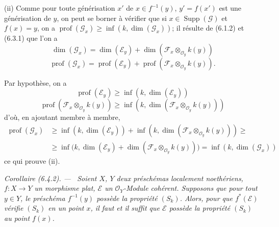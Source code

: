 \documentclass[10pt,oneside]{book}
\newcommand{\oldpage}[2][]{%
  \setcounter{footnote}{0}%
  \marginpar{\scriptsize\textbf{#1}~|~#2}\ignorespaces}
\newenvironment{corollary}[1][]{%
  \par\medskip\noindent\itshape Corollaire (#1). ---\ }{\par}
\begin{document}
\oldpage[IV-2]{142}

(ii) Comme pour toute générisation $x'$ de $x\in f^{-1}(y)$,
$y'=f(x')$ est une générisation de $y$, on peut se borner à vérifier que si
$x\in\operatorname{Supp}(\mathscr G)$ et $f(x)=y$, on a
$\operatorname{prof}(\mathscr G_x)\geq\inf(k,\dim(\mathscr G_x))$; il résulte
de (6.1.2) et (6.3.1) que l'on a
\[
\dim(\mathscr G_x)=\dim(\mathscr E_y)+
\dim(\mathscr F_x\otimes_{\mathcal O_y}k(y))
\]
\[
\operatorname{prof}(\mathscr G_x)=\operatorname{prof}(\mathscr E_y)+
\operatorname{prof}(\mathscr F_x\otimes_{\mathcal O_y}k(y)).
\]

Par hypothèse, on a
\[
\operatorname{prof}(\mathscr E_y)\geq\inf(k,\dim(\mathscr E_y))
\]
\[
\operatorname{prof}(\mathscr F_x\otimes_{\mathcal O_y}k(y))
\geq\inf(k,\dim(\mathscr F_x\otimes_{\mathcal O_y}k(y)))
\]
d'où, en ajoutant membre à membre,
\begin{align*}
\operatorname{prof}(\mathscr G_x)
&\geq\inf(k,\dim(\mathscr E_y))
+\inf(k,\dim(\mathscr F_x\otimes_{\mathcal O_y}k(y)))\geq{}\\
&\geq\inf\bigl(k,\dim(\mathscr E_y)
+\dim(\mathscr F_x\otimes_{\mathcal O_y}k(y))\bigr)
=\inf(k,\dim(\mathscr G_x))
\end{align*}
ce qui prouve (ii).

\begin{corollary}[6.4.2]
\label{IV.2.s6.4.2-fr}
Soient $X$, $Y$ deux préschémas localement noethériens, $f:X\to Y$ un
morphisme plat, $\mathscr E$ un $\mathcal O_Y$-Module cohérent. Supposons que
pour tout $y\in Y$, le préschéma $f^{-1}(y)$ possède la propriété $(S_k)$.
Alors, pour que $f^*(\mathscr E)$ vérifie $(S_k)$ en un point $x$, il faut et
il suffit que $\mathscr E$ possède la propriété $(S_k)$ au point $f(x)$.
\end{corollary}
\end{document}
